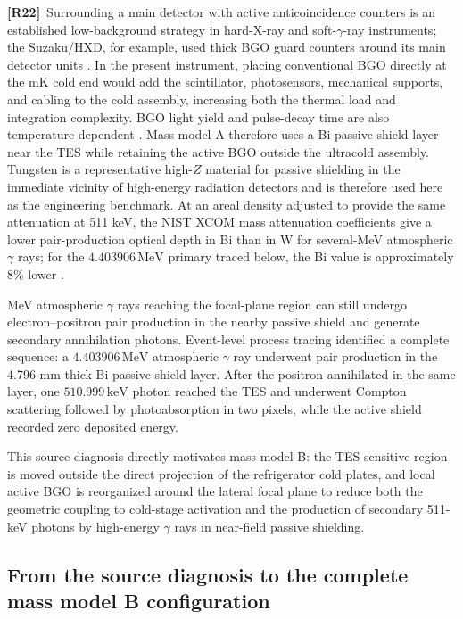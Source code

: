 \documentclass[11pt]{article}
\newcommand{\revmark}[1]{\textcolor{revisionblue}{\textbf{[R#1]}}\ }
\newcommand{\keV}{\ensuremath{\,\mathrm{keV}}}
\newcommand{\MeV}{\ensuremath{\,\mathrm{MeV}}}
\begin{document}
\revmark{22}Surrounding a main detector with active anticoincidence counters is an established low-background strategy in hard-X-ray and soft-$\gamma$-ray instruments; the Suzaku/HXD, for example, used thick BGO guard counters around its main detector units \cite{Takahashi2007HXD}. In the present instrument, placing conventional BGO directly at the mK cold end would add the scintillator, photosensors, mechanical supports, and cabling to the cold assembly, increasing both the thermal load and integration complexity. BGO light yield and pulse-decay time are also temperature dependent \cite{Verdier2011BGO}. Mass model A therefore uses a Bi passive-shield layer near the TES while retaining the active BGO outside the ultracold assembly. Tungsten is a representative high-$Z$ material for passive shielding in the immediate vicinity of high-energy radiation detectors and is therefore used here as the engineering benchmark. At an areal density adjusted to provide the same attenuation at 511 keV, the NIST XCOM mass attenuation coefficients give a lower pair-production optical depth in Bi than in W for several-MeV atmospheric $\gamma$ rays; for the $4.403906\MeV$ primary traced below, the Bi value is approximately 8\% lower \cite{NISTXCOM}.

MeV atmospheric $\gamma$ rays reaching the focal-plane region can still undergo electron--positron pair production in the nearby passive shield and generate secondary annihilation photons. Event-level process tracing identified a complete sequence: a $4.403906\MeV$ atmospheric $\gamma$ ray underwent pair production in the 4.796-mm-thick Bi passive-shield layer. After the positron annihilated in the same layer, one $510.999\keV$ photon reached the TES and underwent Compton scattering followed by photoabsorption in two pixels, while the active shield recorded zero deposited energy.

This source diagnosis directly motivates mass model B: the TES sensitive region is moved outside the direct projection of the refrigerator cold plates, and local active BGO is reorganized around the lateral focal plane to reduce both the geometric coupling to cold-stage activation and the production of secondary 511-keV photons by high-energy $\gamma$ rays in near-field passive shielding.
\endgroup

\FloatBarrier

\subsection{From the source diagnosis to the complete mass model B configuration}
\label{subsec:optimized_shield_results}
\end{document}
